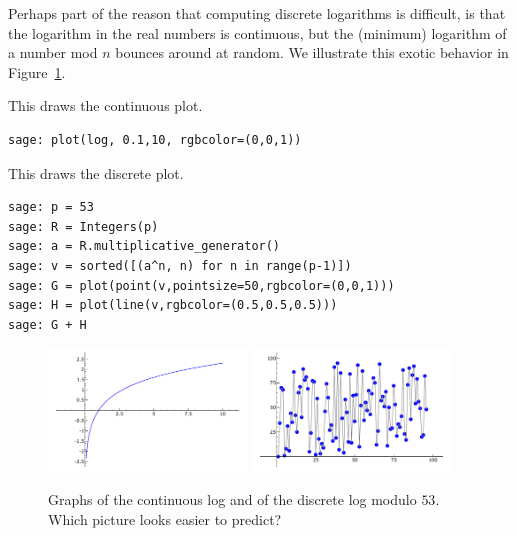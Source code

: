 \begin{sg}
Perhaps part of the reason that computing discrete logarithms is
difficult, is that the logarithm in the real numbers is continuous,
but the (minimum) logarithm of a number mod $n$ bounces around at
random.  We illustrate this exotic behavior in Figure~\ref{fig:logs}.

This draws the continuous plot.
\begin{verbatim}
sage: plot(log, 0.1,10, rgbcolor=(0,0,1))
\end{verbatim}

This draws the discrete plot.
\begin{verbatim}
sage: p = 53
sage: R = Integers(p)
sage: a = R.multiplicative_generator()
sage: v = sorted([(a^n, n) for n in range(p-1)])
sage: G = plot(point(v,pointsize=50,rgbcolor=(0,0,1)))
sage: H = plot(line(v,rgbcolor=(0.5,0.5,0.5)))
sage: G + H
\end{verbatim}

\begin{figure}
\begin{center}
%
\includegraphics[width=0.47\textwidth]{graphics/log}
%
\includegraphics[width=0.47\textwidth]{graphics/dlog}
\vspace{1em}
\caption{Graphs of the continuous log and of the discrete log modulo $53$.\label{fig:logs}  Which picture looks easier to predict?}
\end{center}
\end{figure}
\end{sg}


